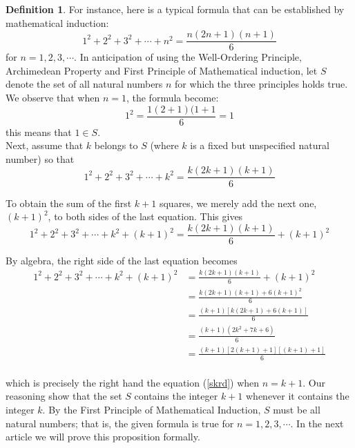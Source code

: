 \documentclass{book}
\theoremstyle{definition}
\newtheorem{definition}{Definition}[section]
\theoremstyle{remark}
\begin{document}
\begin{definition}
For instance, here is a typical formula that can be established by mathematical induction: 
    \begin{equation}
    \label{skrd}
        1^2 + 2^2 + 3^2 + \cdots + n^2 = \frac{n(2n+1)(n+1)}{6} 
    \end{equation}
for $n = 1, 2, 3 , \cdots$. In anticipation of using the Well-Ordering Principle, Archimedean Property and First Principle of Mathematical induction, let $S$ denote the set of all natural numbers $n$ for which the three principles holds true. We observe that when $n=1$, the formula become: 
    \begin{equation*}
        1^2 = \frac{1(2+1)(1+1}{6}=1 \nonumber
    \end{equation*}
this means that $1 \in S$. \\

Next, assume that $k$ belongs to $S$ (where $k$ is a fixed but unspecified natural number) so that
    \begin{equation*}
        1^2 + 2^2 + 3^2 + \cdots + k^2 = \frac{k(2k+1)(k+1)}{6} \nonumber
    \end{equation*}

To obtain the sum of the first $k+1$ squares, we merely add the next one, $(k+1)^2$, to both sides of the last equation. This gives
    \begin{equation*}
        1^2 + 2^2 + 3^2 + \cdots + k^2 + (k+1)^2 = \frac{k(2k+1)(k+1)}{6} + (k+1)^2 \nonumber
    \end{equation*}

By algebra, the right side of the last equation becomes
    \begin{align*}
        1^2 + 2^2 + 3^2 + \cdots + k^2 + (k+1)^2 & = \frac{k(2k+1)(k+1)}{6} + (k+1)^2 \\
            & = \frac{k(2k+1)(k+1) + 6(k+1)^2}{6} \\
            & = \frac{(k+1)[k(2k+1)+6(k+1)]}{6} \\
            & = \frac{(k+1)(2k^2 + 7k + 6)}{6} \\
            & = \frac{(k+1)[2(k+1)+1][(k+1)+1]}{6} \\
    \end{align*}

which is precisely the right hand the equation (\ref{skrd}) when $n=k+1$. Our reasoning show that the set $S$ contains the integer $k+1$ whenever it contains the integer $k$. By the First Principle of Mathematical Induction, $S$ must be all natural numbers; that is, the given formula is true for $n = 1,2,3, \cdots$. In the next article we will prove this proposition formally. 
\end{definition}
\end{document}
